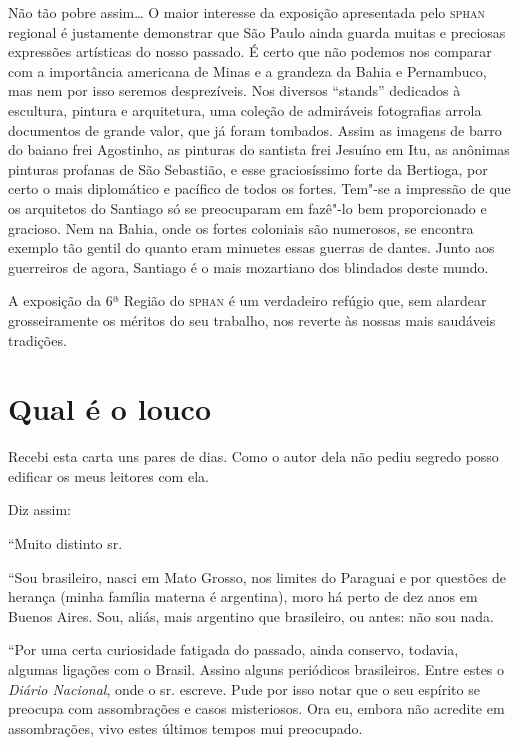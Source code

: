Não tão pobre assim\ldots{} O maior interesse da exposição apresentada pelo
\textsc{sphan} regional é justamente demonstrar que São Paulo ainda guarda muitas
e preciosas expressões artísticas do nosso passado. É certo que não
podemos nos comparar com a importância americana de Minas e a grandeza
da Bahia e Pernambuco, mas nem por isso seremos desprezíveis. Nos
diversos ``stands'' dedicados à escultura, pintura e arquitetura, uma
coleção de admiráveis fotografias arrola documentos de grande valor, que
já foram tombados. Assim as imagens de barro do baiano frei Agostinho,
as pinturas do santista frei Jesuíno em Itu, as anônimas pinturas
profanas de São Sebastião, e esse graciosíssimo forte da Bertioga, por
certo o mais diplomático e pacífico de todos os fortes. Tem"-se a
impressão de que os arquitetos do Santiago só se preocuparam em fazê"-lo
bem proporcionado e gracioso. Nem na Bahia, onde os fortes coloniais são
numerosos, se encontra exemplo tão gentil do quanto eram minuetes essas
guerras de dantes. Junto aos guerreiros de agora, Santiago é o mais
mozartiano dos blindados deste mundo.

A exposição da 6ª Região do \textsc{sphan} é um verdadeiro refúgio que, sem
alardear grosseiramente os méritos do seu trabalho, nos reverte às
nossas mais saudáveis tradições.

\chapter{Qual é o louco}

Recebi esta carta uns pares de dias. Como o autor dela não pediu segredo
posso edificar os meus leitores com ela.

Diz assim:

``Muito distinto sr.

``Sou brasileiro, nasci em Mato Grosso, nos limites do Paraguai e por
questões de herança (minha família materna é argentina), moro há perto
de dez anos em Buenos Aires. Sou, aliás, mais argentino que brasileiro,
ou antes: não sou nada.

``Por uma certa curiosidade fatigada do passado, ainda conservo,
todavia, algumas ligações com o Brasil. Assino alguns periódicos
brasileiros. Entre estes o \emph{Diário Nacional}, onde o sr. escreve.
Pude por isso notar que o seu espírito se preocupa com assombrações e
casos misteriosos. Ora eu, embora não acredite em assombrações, vivo
estes últimos tempos mui preocupado.

